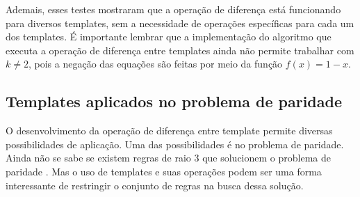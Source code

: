 \begin{table}[h!]
\centering
\caption{Propriedades estáticas utilizadas para o teste da operação de diferença em cada raio}
\label{tab:differenceTests}
\end{table}

Ademais, esses testes mostraram que a operação de diferença está funcionando para diversos templates, sem a necessidade de operações específicas para cada um dos templates. É importante lembrar que a implementação do algoritmo que executa a operação de diferença entre templates ainda não permite trabalhar com $k\neq 2$, pois a negação das equações são feitas por meio da função $f(x) = 1 - x$.

\subsection{Templates aplicados no problema de paridade}
O desenvolvimento da operação de diferença entre template permite diversas possibilidades de aplicação.
Uma das possibilidades é no problema de paridade. 
Ainda não se sabe se existem regras de raio 3 que solucionem o problema de paridade \cite{Betel2013}. 
Mas o uso de templates e suas operações podem ser uma forma interessante de restringir o conjunto de regras na busca dessa solução.

